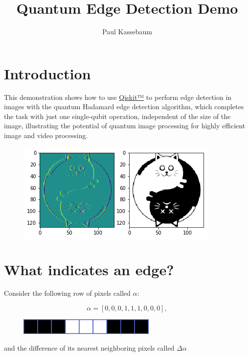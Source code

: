 \documentclass[11pt]{article}
\title{Quantum Edge Detection Demo}
\author{Paul Kassebaum}
\makeatletter
\def\maxwidth{\ifdim\Gin@nat@width>\linewidth\linewidth
    \else\Gin@nat@width\fi}
\let\Oldincludegraphics\includegraphics
\renewcommand{\includegraphics}[1]{\Oldincludegraphics[width=.8\maxwidth]{#1}}
\makeatother
\begin{document}
    
    
    \maketitle
    


    \hypertarget{quantum-edge-detection}{%
\section{Introduction}\label{quantum-edge-detection}}

This demonstration shows how to use \href{https://qiskit.org/}{Qiskit™}
to perform edge detection in images with the quantum Hadamard edge
detection algorithm, which completes the task with just one single-qubit
operation, independent of the size of the image, illustrating the
potential of quantum image processing for highly efficient image and
video processing.

\begin{figure}[h]
\centering
\includegraphics{../img/edge.png}
\end{figure}

    \hypertarget{what-indicates-an-edge}{%
\section{What indicates an edge?}\label{what-indicates-an-edge}}

    Consider the following row of pixels called \(\alpha\):

\[\alpha = [0, 0, 0, 1, 1, 1, 0, 0, 0],\]

\begin{figure}[h]
\centering
\includegraphics{../img/p.png}
\end{figure}

and the difference of its nearest neighboring pixels called
\(\Delta \alpha\)
\end{document}
